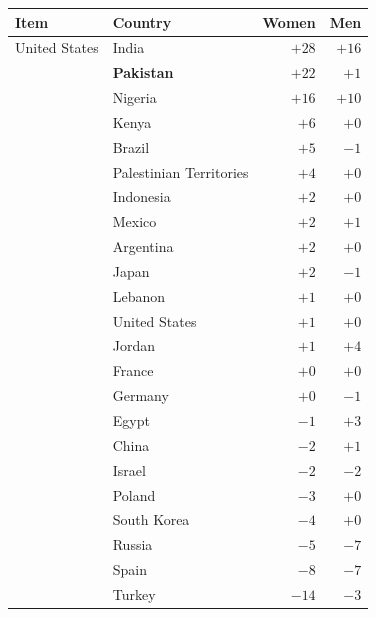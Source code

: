 \begin{tabular}{llrr}
\toprule
Item & Country & Women & Men \\
\midrule
United States & India & $+28$ & $+16$ \\
 & \textbf{Pakistan} & $+22$ & $+1$ \\
 & Nigeria & $+16$ & $+10$ \\
 & Kenya & $+6$ & $+0$ \\
 & Brazil & $+5$ & $-1$ \\
 & Palestinian Territories & $+4$ & $+0$ \\
 & Indonesia & $+2$ & $+0$ \\
 & Mexico & $+2$ & $+1$ \\
 & Argentina & $+2$ & $+0$ \\
 & Japan & $+2$ & $-1$ \\
 & Lebanon & $+1$ & $+0$ \\
 & United States & $+1$ & $+0$ \\
 & Jordan & $+1$ & $+4$ \\
 & France & $+0$ & $+0$ \\
 & Germany & $+0$ & $-1$ \\
 & Egypt & $-1$ & $+3$ \\
 & China & $-2$ & $+1$ \\
 & Israel & $-2$ & $-2$ \\
 & Poland & $-3$ & $+0$ \\
 & South Korea & $-4$ & $+0$ \\
 & Russia & $-5$ & $-7$ \\
 & Spain & $-8$ & $-7$ \\
 & Turkey & $-14$ & $-3$ \\
\bottomrule
\end{tabular}
